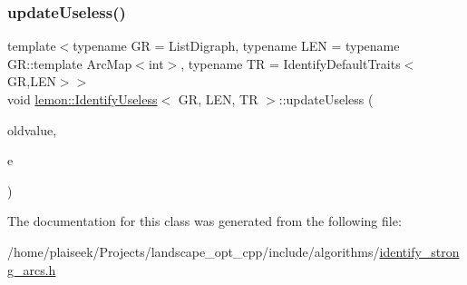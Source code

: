 \subsubsection{\texorpdfstring{update\+Useless()}{updateUseless()}}
{\footnotesize\ttfamily template$<$typename GR  = List\+Digraph, typename L\+EN  = typename G\+R\+::template Arc\+Map$<$int$>$, typename TR  = Identify\+Default\+Traits$<$\+G\+R,\+L\+E\+N$>$$>$ \\
void \hyperlink{classlemon_1_1_identify_useless}{lemon\+::\+Identify\+Useless}$<$ GR, L\+EN, TR $>$\+::update\+Useless (\begin{DoxyParamCaption}\item[{\hyperlink{classlemon_1_1_identify_useless_ad44b00c430e4b58280c0399b4a02de4d}{Labeled\+Dist} \&}]{oldvalue,  }\item[{Arc \&}]{e }\end{DoxyParamCaption})\hspace{0.3cm}{\ttfamily [inline]}}



The documentation for this class was generated from the following file\+:\begin{DoxyCompactItemize}
\item 
/home/plaiseek/\+Projects/landscape\+\_\+opt\+\_\+cpp/include/algorithms/\hyperlink{identify__strong__arcs_8h}{identify\+\_\+strong\+\_\+arcs.\+h}\end{DoxyCompactItemize}

